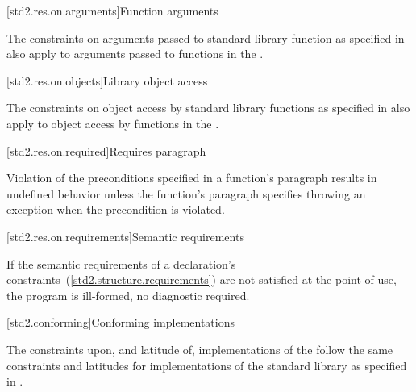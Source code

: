 [std2.res.on.arguments]{Function arguments}

\pnum
{}%
%
The constraints on arguments passed to \Cpp standard library function as
specified in  also apply to arguments passed to
functions in the .

[std2.res.on.objects]{Library object access}

\pnum
The constraints on object access by \Cpp standard library functions as specified
in  also apply to object access by functions in the
.

[std2.res.on.required]{Requires paragraph}

\pnum
{}%
Violation of the preconditions specified in a function's \requires paragraph
results in undefined behavior unless the function's \throws paragraph specifies
throwing an exception when the precondition is violated.

[std2.res.on.requirements]{Semantic requirements}

\pnum
If the semantic requirements of a declaration's
constraints~(\ref{std2.structure.requirements}) are not satisfied at the point of
use, the program is ill-formed, no diagnostic required.

[std2.conforming]{Conforming implementations}

\pnum
The constraints upon, and latitude of, implementations of the 
follow the same constraints and latitudes for implementations of the \Cpp
standard library as specified in .

